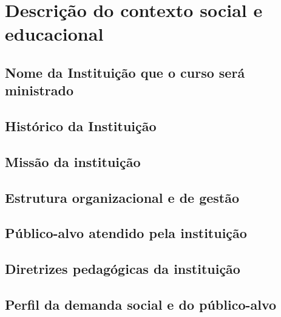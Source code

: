 \chapter{Descrição do contexto social e educacional}

\section{Nome da Instituição que o curso será ministrado}

\section{Histórico da Instituição}

\section{Missão da instituição}

\section{Estrutura organizacional e de gestão}

\section{Público-alvo atendido pela instituição }

\section{Diretrizes pedagógicas da instituição}

\section{Perfil da demanda social e do público-alvo}

\newpage